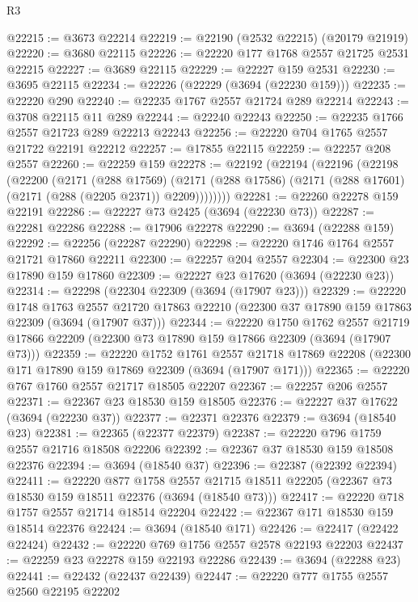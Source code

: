 \begin{lexlean}{R3}
\begin{coremodule}
@22215 := @3673 @22214
@22219 := @22190 (@2532 @22215) (@20179 @21919)
@22220 := @3680 @22115
@22226 := @22220 @177 @1768 @2557 @21725 @2531 @22215
@22227 := @3689 @22115
@22229 := @22227 @159 @2531
@22230 := @3695 @22115
@22234 := @22226 (@22229 (@3694 (@22230 @159)))
@22235 := @22220 @290
@22240 := @22235 @1767 @2557 @21724 @289 @22214
@22243 := @3708 @22115 @11 @289
@22244 := @22240 @22243
@22250 := @22235 @1766 @2557 @21723 @289 @22213 @22243
@22256 := @22220 @704 @1765 @2557 @21722 @22191 @22212
@22257 := @17855 @22115
@22259 := @22257 @208 @2557
@22260 := @22259 @159
@22278 := @22192
    (@22194
      (@22196
        (@22198
          (@22200
            (@2171
              (@288 @17569)
              (@2171 (@288 @17586) (@2171 (@288 @17601) (@2171 (@288 (@2205 @2371)) @2209))))))))
@22281 := @22260 @22278 @159 @22191
@22286 := @22227 @73 @2425 (@3694 (@22230 @73))
@22287 := @22281 @22286
@22288 := @17906 @22278
@22290 := @3694 (@22288 @159)
@22292 := @22256 (@22287 @22290)
@22298 := @22220 @1746 @1764 @2557 @21721 @17860 @22211
@22300 := @22257 @204 @2557
@22304 := @22300 @23 @17890 @159 @17860
@22309 := @22227 @23 @17620 (@3694 (@22230 @23))
@22314 := @22298 (@22304 @22309 (@3694 (@17907 @23)))
@22329 := @22220
    @1748
    @1763
    @2557
    @21720
    @17863
    @22210
    (@22300 @37 @17890 @159 @17863 @22309 (@3694 (@17907 @37)))
@22344 := @22220
    @1750
    @1762
    @2557
    @21719
    @17866
    @22209
    (@22300 @73 @17890 @159 @17866 @22309 (@3694 (@17907 @73)))
@22359 := @22220
    @1752
    @1761
    @2557
    @21718
    @17869
    @22208
    (@22300 @171 @17890 @159 @17869 @22309 (@3694 (@17907 @171)))
@22365 := @22220 @767 @1760 @2557 @21717 @18505 @22207
@22367 := @22257 @206 @2557
@22371 := @22367 @23 @18530 @159 @18505
@22376 := @22227 @37 @17622 (@3694 (@22230 @37))
@22377 := @22371 @22376
@22379 := @3694 (@18540 @23)
@22381 := @22365 (@22377 @22379)
@22387 := @22220 @796 @1759 @2557 @21716 @18508 @22206
@22392 := @22367 @37 @18530 @159 @18508 @22376
@22394 := @3694 (@18540 @37)
@22396 := @22387 (@22392 @22394)
@22411 := @22220
    @877
    @1758
    @2557
    @21715
    @18511
    @22205
    (@22367 @73 @18530 @159 @18511 @22376 (@3694 (@18540 @73)))
@22417 := @22220 @718 @1757 @2557 @21714 @18514 @22204
@22422 := @22367 @171 @18530 @159 @18514 @22376
@22424 := @3694 (@18540 @171)
@22426 := @22417 (@22422 @22424)
@22432 := @22220 @769 @1756 @2557 @2578 @22193 @22203
@22437 := @22259 @23 @22278 @159 @22193 @22286
@22439 := @3694 (@22288 @23)
@22441 := @22432 (@22437 @22439)
@22447 := @22220 @777 @1755 @2557 @2560 @22195 @22202

\end{coremodule}
\end{lexlean}
